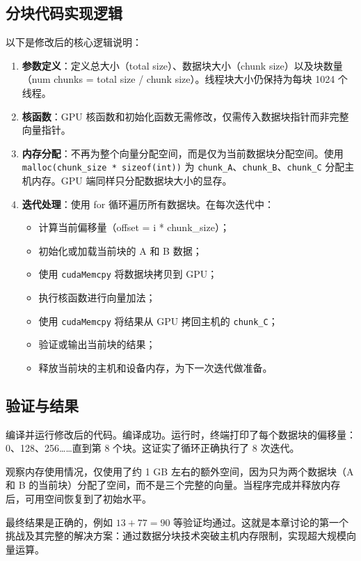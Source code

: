 \subsection{分块代码实现逻辑}

以下是修改后的核心逻辑说明：

\begin{enumerate}
    \item \textbf{参数定义}：定义总大小（total size）、数据块大小（chunk size）以及块数量（num chunks = total size / chunk size）。线程块大小仍保持为每块 1024 个线程。
    \item \textbf{核函数}：GPU 核函数和初始化函数无需修改，仅需传入数据块指针而非完整向量指针。
    \item \textbf{内存分配}：不再为整个向量分配空间，而是仅为当前数据块分配空间。使用 \texttt{malloc(chunk\_size * sizeof(int))} 为 \texttt{chunk\_A}、\texttt{chunk\_B}、\texttt{chunk\_C} 分配主机内存。GPU 端同样只分配数据块大小的显存。
    \item \textbf{迭代处理}：使用 for 循环遍历所有数据块。在每次迭代中：
    \begin{itemize}
        \item 计算当前偏移量（offset = i * chunk\_size）；
        \item 初始化或加载当前块的 A 和 B 数据；
        \item 使用 \texttt{cudaMemcpy} 将数据块拷贝到 GPU；
        \item 执行核函数进行向量加法；
        \item 使用 \texttt{cudaMemcpy} 将结果从 GPU 拷回主机的 \texttt{chunk\_C}；
        \item 验证或输出当前块的结果；
        \item 释放当前块的主机和设备内存，为下一次迭代做准备。
    \end{itemize}
\end{enumerate}

\subsection{验证与结果}

编译并运行修改后的代码。编译成功。运行时，终端打印了每个数据块的偏移量：0、128、256……直到第 8 个块。这证实了循环正确执行了 8 次迭代。

观察内存使用情况，仅使用了约 1 GB 左右的额外空间，因为只为两个数据块（A 和 B 的当前块）分配了空间，而不是三个完整的向量。当程序完成并释放内存后，可用空间恢复到了初始水平。

最终结果是正确的，例如 $13 + 77 = 90$ 等验证均通过。这就是本章讨论的第一个挑战及其完整的解决方案：通过数据分块技术突破主机内存限制，实现超大规模向量运算。

